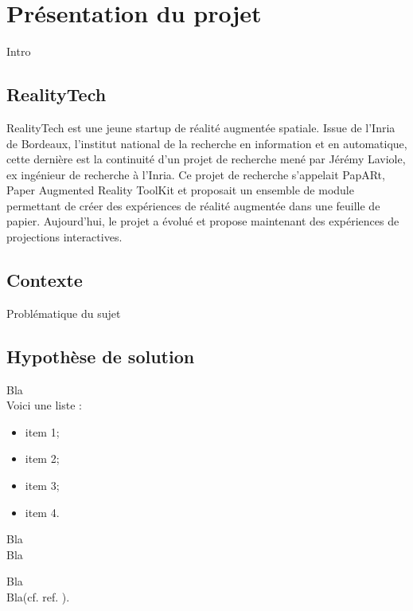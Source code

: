 \chapter{Présentation du projet}

Intro\footnotemark\\

\section{RealityTech}
RealityTech est une jeune startup de réalité augmentée spatiale. Issue de l'Inria de Bordeaux, l'institut national de la recherche en information et en automatique, cette dernière est la continuité d'un projet de recherche mené par Jérémy Laviole, ex ingénieur de recherche à l'Inria. Ce projet de recherche s'appelait PapARt, Paper Augmented Reality ToolKit et proposait un ensemble de module permettant de créer des expériences de réalité augmentée dans une feuille de papier. Aujourd'hui, le projet a évolué et propose maintenant des expériences de projections interactives.

\section{Contexte}

\begin{center}
Problématique du sujet
\end{center}

\section{Hypothèse de solution}

Bla\\

Voici une liste :
\begin{itemize}
\item item 1;
\item item 2;
\item item 3;
\item item 4.
\end{itemize}

Bla\\

Bla

Bla\footnotemark\\

Bla(cf. ref. \cite{cite6}).

